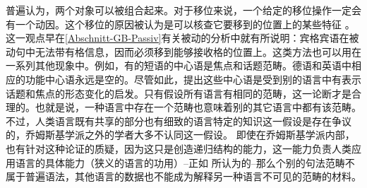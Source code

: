 普遍认为，两个对象可以被组合起来\citep[]{Chomsky95a-u}。对于移位来说，一个给定的移位操作一定会有一个动因。这个移位的原因被认为是可以核查它要移到的位置上的某些特征
。这一观点早在\ref{Abschnitt-GB-Passiv}有关被动的分析中就有所说明：宾格宾语在被动句中无法带有格信息，因而必须移到能够接收格的位置上。这类方法也可以用在一系列其他现象中。例如，有的短语的中心语是焦点和话题范畴。德语和英语中相应的功能中心语永远是空的。尽管如此，提出这些中心语是受到别的语言中有表示话题和焦点的形态变化的启发。只有假设所有语言有相同的范畴，这一论断才是合理的。也就是说，一种语言中存在一个范畴也意味着别的其它语言中都有该范畴。不过，人类语言既有共享的部分也有细致的语言特定的知识这一假设是存在争议的，乔姆斯基学派之外的学者大多不认同这一假设。 即使在乔姆斯基学派内部，也有针对这种论证的质疑，因为这只是创造递归结构的能力，这一能力负责人类应用语言的具体能力（狭义的语言的功用）--正如 \citet*{HCF2002a}所认为的--那么个别的句法范畴不属于普遍语法，其他语言的数据也不能成为解释另一种语言不可见的范畴的材料。

